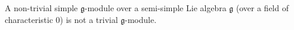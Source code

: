 A non-trivial simple $\mathfrak{g}$-module over a semi-simple Lie algebra $\mathfrak{g}$ (over a field of characteristic $0$) is not a trivial $\mathfrak{g}$-module.
